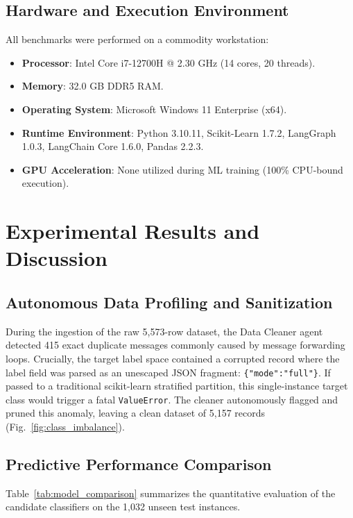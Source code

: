 \documentclass[conference]{IEEEtran}
\begin{document}
\subsection{Hardware and Execution Environment}
All benchmarks were performed on a commodity workstation:
\begin{itemize}
    \item \textbf{Processor}: Intel Core i7-12700H @ 2.30 GHz (14 cores, 20 threads).
    \item \textbf{Memory}: 32.0 GB DDR5 RAM.
    \item \textbf{Operating System}: Microsoft Windows 11 Enterprise (x64).
    \item \textbf{Runtime Environment}: Python 3.10.11, Scikit-Learn 1.7.2, LangGraph 1.0.3, LangChain Core 1.6.0, Pandas 2.2.3.
    \item \textbf{GPU Acceleration}: None utilized during ML training (100\% CPU-bound execution).
\end{itemize}

\section{Experimental Results and Discussion}

\subsection{Autonomous Data Profiling and Sanitization}
During the ingestion of the raw 5,573-row dataset, the Data Cleaner agent detected 415 exact duplicate messages commonly caused by message forwarding loops. Crucially, the target label space contained a corrupted record where the label field was parsed as an unescaped JSON fragment: \texttt{\{"mode":"full"\}}. If passed to a traditional scikit-learn stratified partition, this single-instance target class would trigger a fatal \texttt{ValueError}. The cleaner autonomously flagged and pruned this anomaly, leaving a clean dataset of 5,157 records (Fig.~\ref{fig:class_imbalance}).

\subsection{Predictive Performance Comparison}
Table~\ref{tab:model_comparison} summarizes the quantitative evaluation of the candidate classifiers on the 1,032 unseen test instances.
\end{document}
